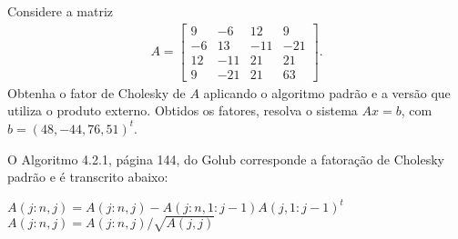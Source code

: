 \begin{questions}
    \question Considere a matriz
    \begin{align*}
        A = \begin{bmatrix}
            9 & -6 & 12 & 9 \\
            -6 & 13 & -11 & -21 \\
            12 & -11 & 21 & 21 \\
            9 & -21 & 21 & 63
        \end{bmatrix}.
    \end{align*}
    Obtenha o fator de Cholesky de $A$ aplicando o algoritmo padr\~{a}o e a vers\~{a}o que utiliza o produto externo. Obtidos os fatores, resolva o sistema $A x = b$, com $b = \left( 48, -44, 76, 51 \right)^t$.
    \begin{solution}
        O Algoritmo 4.2.1, p\'{a}gina 144, do Golub\nocite{Golub:1996:matrix} corresponde a fatora\c{c}\~{a}o de Cholesky padr\~{a}o e \'{e} transcrito abaixo:
        \begin{algorithmic}
                    \State $A(j:n, j) = A(j:n, j) - A(j:n, 1:j - 1) A(j, 1:j - 1)^t$
                \EndIf
                \State $A(j:n, j) = A(j:n, j) / \sqrt{A(j,j)}$
            \EndFor
        \end{algorithmic}


\end{solution}
\end{questions}
